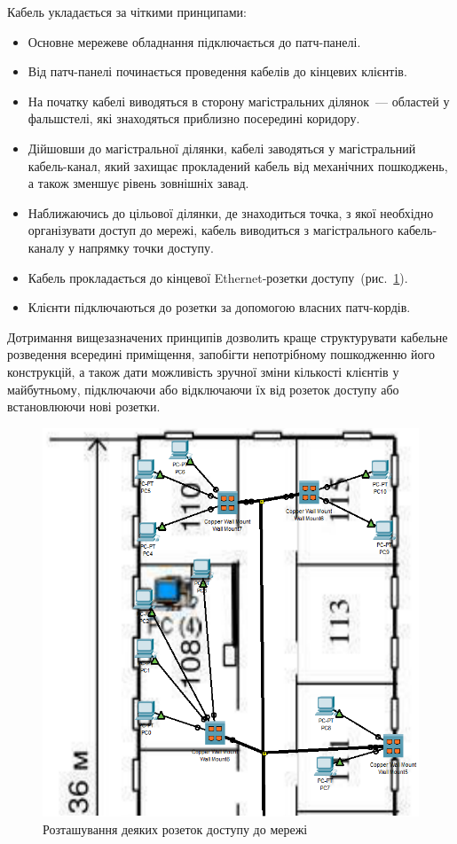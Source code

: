 \documentclass[
  ukrainian,
  simple,
  floatsection,
]{eskdnaukvd}
\newlength{\gridunitwidth}
\begin{document}
      Кабель укладається за чіткими принципами:
      \begin{itemize}
        \item Основне мережеве обладнання підключається до патч-панелі.
        \item Від патч-панелі починається проведення кабелів до кінцевих клієнтів.
        \item На початку кабелі виводяться в сторону магістральних ділянок~— областей у фальшстелі, які знаходяться приблизно посередині коридору.
        \item Дійшовши до магістральної ділянки, кабелі заводяться у магістральний кабель-канал, який захищає прокладений кабель від механічних пошкоджень, а також зменшує рівень зовнішніх завад.
        \item Наближаючись до цільової ділянки, де знаходиться точка, з якої необхідно організувати доступ до мережі, кабель виводиться з магістрального кабель-каналу у напрямку точки доступу.
        \item Кабель прокладається до кінцевої \textenglish{Ethernet}-розетки доступу~(рис.~\ref{fig:wall-outlets}).
        \item Клієнти підключаються до розетки за допомогою власних патч-кордів.
      \end{itemize}
      Дотримання вищезазначених принципів дозволить краще структурувати кабельне розведення всередині приміщення, запобігти непотрібному пошкодженню його конструкцій, а також дати можливість зручної зміни кількості клієнтів у майбутньому, підключаючи або відключаючи їх від розеток доступу або встановлюючи нові розетки.

      \begin{figure}[!htbp]
        \centering
        \includegraphics[width = 6 \gridunitwidth]{./assets/08-wall-outlets.png}
        \caption{Розташування деяких розеток доступу до мережі}
        \label{fig:wall-outlets}
      \end{figure}
\end{document}
